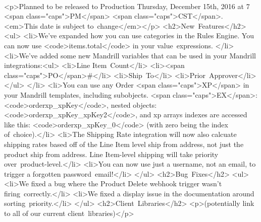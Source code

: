 \documentclass{memoir}%
\begin{document}
\paragraph*{}%
<p>Planned to be released to Production Thursday, December 15th, 2016 at 7 <span class="caps">PM</span> <span class="caps">CST</span>. <em>This date is subject to~change</em></p>\newline%
<h2>New~Features</h2>\newline%
<ul>\newline%
<li>We’ve expanded how you can use categories in the Rules Engine. You can now use <code>items.total</code> in your value~expressions. </li>\newline%
<li>We’ve added some new Mandrill variables that can be used in your Mandrill integrations:<ul>\newline%
<li>Line Item~Count</li>\newline%
<li><span class="caps">PO</span>\#</li>\newline%
<li>Ship~To</li>\newline%
<li>Prior~Approver</li>\newline%
</ul>\newline%
</li>\newline%
<li>You can use any Order <span class="caps">XP</span> in your Mandrill templates, including subobjects. <span class="caps">EX</span>: <code>orderxp\_xpKey</code>, nested objects: <code>orderxp\_xpKey\_xpKey2</code>, and xp arrays indexes are accessed like this: <code>orderxp\_xpKey\_0</code> (with zero being the index of~choice).</li>\newline%
<li>The Shipping Rate integration will now also calcuate shipping rates based off of the Line Item level ship from address, not just the product ship from address. Line Item{-}level shipping will take priority over~product{-}level.</li>\newline%
<li>You can now use just a username, not an email, to trigger a forgotten password~email!</li>\newline%
</ul>\newline%
<h2>Bug~Fixes</h2>\newline%
<ul>\newline%
<li>We fixed a bug where the Product Delete webhook trigger wasn’t firing~correctly.</li>\newline%
<li>We fixed a display issue in the documentation around sorting~priority.</li>\newline%
</ul>\newline%
<h2>Client~Libraries</h2>\newline%
<p>(potentially link to all of our current client~libraries)</p>
\end{document}
